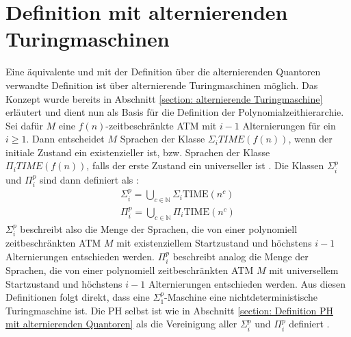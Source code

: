 \section{Definition mit alternierenden Turingmaschinen} \label{section: Definition PH mit ATM}
Eine äquivalente und mit der Definition über die alternierenden Quantoren verwandte Definition ist über alternierende Turingmaschinen möglich.
Das Konzept wurde bereits in Abschnitt \ref{section: alternierende Turingmaschine} erläutert und dient nun als Basis für die Definition der Polynomialzeithierarchie.
Sei dafür $M$ eine $f(n)$-zeitbeschränkte ATM  mit $i - 1$ Alternierungen für ein $i \geq 1$. Dann entscheidet $M$ Sprachen der Klasse $\Sigma_i TIME(f(n))$, wenn der initiale Zustand ein existenzieller ist,
bzw. Sprachen der Klasse $\Pi_i TIME(f(n))$, falls der erste Zustand ein universeller ist \cite{arora_computational_2009}.
Die Klassen $\Sigma^p_i$ und $\Pi^p_i$ sind dann definiert als \cite{arora_computational_2009}:
\begin{align}
    \Sigma^p_i = \bigcup_{c \in \mathbb{N}} \Sigma_i \text{TIME}(n^c) \\
    \Pi^p_i = \bigcup_{c \in \mathbb{N}} \Pi_i \text{TIME}(n^c)
\end{align}
$\Sigma^p_i$ beschreibt also die Menge der Sprachen, die von einer polynomiell zeitbeschränkten ATM $M$ mit existenziellem Startzustand und höchstens $i-1$ Alternierungen entschieden werden.
$\Pi^p_i$ beschreibt analog die Menge der Sprachen, die von einer polynomiell zeitbeschränkten ATM $M$ mit universellem Startzustand und höchstens $i-1$ Alternierungen entschieden werden.
Aus diesen Definitionen folgt direkt, dass eine $\Sigma^p_1$-Maschine eine nichtdeterministische Turingmaschine ist.
Die PH selbst ist wie in Abschnitt \ref{section: Definition PH mit alternierenden Quantoren} als die Vereinigung aller $\Sigma^p_i$ und $\Pi^p_i$ definiert \cite{sipser_introduction_2012}.


